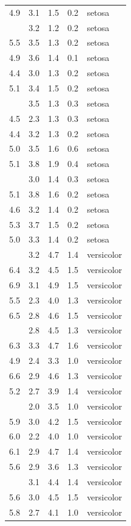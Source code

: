 \documentclass[
]{article}
\begin{document}
\begin{longtable}[t]{lllll}
4.9 & 3.1 & 1.5 & 0.2 & setosa\\
\addlinespace
5.0 & 3.2 & 1.2 & 0.2 & setosa\\
5.5 & 3.5 & 1.3 & 0.2 & setosa\\
4.9 & 3.6 & 1.4 & 0.1 & setosa\\
4.4 & 3.0 & 1.3 & 0.2 & setosa\\
5.1 & 3.4 & 1.5 & 0.2 & setosa\\
\addlinespace
5.0 & 3.5 & 1.3 & 0.3 & setosa\\
4.5 & 2.3 & 1.3 & 0.3 & setosa\\
4.4 & 3.2 & 1.3 & 0.2 & setosa\\
5.0 & 3.5 & 1.6 & 0.6 & setosa\\
5.1 & 3.8 & 1.9 & 0.4 & setosa\\
\addlinespace
4.8 & 3.0 & 1.4 & 0.3 & setosa\\
5.1 & 3.8 & 1.6 & 0.2 & setosa\\
4.6 & 3.2 & 1.4 & 0.2 & setosa\\
5.3 & 3.7 & 1.5 & 0.2 & setosa\\
5.0 & 3.3 & 1.4 & 0.2 & setosa\\
\addlinespace
7.0 & 3.2 & 4.7 & 1.4 & versicolor\\
6.4 & 3.2 & 4.5 & 1.5 & versicolor\\
6.9 & 3.1 & 4.9 & 1.5 & versicolor\\
5.5 & 2.3 & 4.0 & 1.3 & versicolor\\
6.5 & 2.8 & 4.6 & 1.5 & versicolor\\
\addlinespace
5.7 & 2.8 & 4.5 & 1.3 & versicolor\\
6.3 & 3.3 & 4.7 & 1.6 & versicolor\\
4.9 & 2.4 & 3.3 & 1.0 & versicolor\\
6.6 & 2.9 & 4.6 & 1.3 & versicolor\\
5.2 & 2.7 & 3.9 & 1.4 & versicolor\\
\addlinespace
5.0 & 2.0 & 3.5 & 1.0 & versicolor\\
5.9 & 3.0 & 4.2 & 1.5 & versicolor\\
6.0 & 2.2 & 4.0 & 1.0 & versicolor\\
6.1 & 2.9 & 4.7 & 1.4 & versicolor\\
5.6 & 2.9 & 3.6 & 1.3 & versicolor\\
\addlinespace
6.7 & 3.1 & 4.4 & 1.4 & versicolor\\
5.6 & 3.0 & 4.5 & 1.5 & versicolor\\
5.8 & 2.7 & 4.1 & 1.0 & versicolor\\

\end{longtable}
\end{document}
